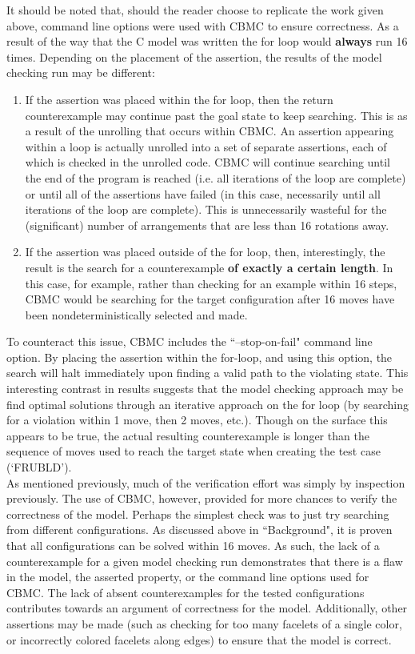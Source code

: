 \documentclass{article}
\begin{document}
\noindent It should be noted that, should the reader choose to replicate the work given above, command line options were used with CBMC to ensure correctness. As a result of the way that the C model was written the for loop would \textbf{always} run 16 times. Depending on the placement of the assertion, the results of the model checking run may be different:

\begin{enumerate}
\item If the assertion was placed within the for loop, then the return counterexample may continue past the goal state to keep searching. This is as a result of the unrolling that occurs within CBMC. An assertion appearing within a loop is actually unrolled into a set of separate assertions, each of which is checked in the unrolled code. CBMC will continue searching until the end of the program is reached (i.e. all iterations of the loop are complete) or until all of the assertions have failed (in this case, necessarily until all iterations of the loop are complete). This is unnecessarily wasteful for the (significant) number of arrangements that are less than 16 rotations away.
\item If the assertion was placed outside of the for loop, then, interestingly, the result is the search for a counterexample \textbf{of exactly a certain length}. In this case, for example, rather than checking for an example within 16 steps, CBMC would be searching for the target configuration after 16 moves have been nondeterministically selected and made.
\end{enumerate}

\noindent To counteract this issue, CBMC includes the ``--stop-on-fail" command line option. By placing the assertion within the for-loop, and using this option, the search will halt immediately upon finding a valid path to the violating state. This interesting contrast in results suggests that the model checking approach may be find optimal solutions through an iterative approach on the for loop (by searching for a violation within 1 move, then 2 moves, etc.). Though on the surface this appears to be true, the actual resulting counterexample is longer than the sequence of moves used to reach the target state when creating the test case (`FRUBLD').\\

\noindent As mentioned previously, much of the verification effort was simply by inspection previously. The use of CBMC, however, provided for more chances to verify the correctness of the model. Perhaps the simplest check was to just try searching from different configurations. As discussed above in ``Background", it is proven that all configurations can be solved within 16 moves. As such, the lack of a counterexample for a given model checking run demonstrates that there is a flaw in the model, the asserted property, or the command line options used for CBMC. The lack of absent counterexamples for the tested configurations contributes towards an argument of correctness for the model. Additionally, other assertions may be made (such as checking for too many facelets of a single color, or incorrectly colored facelets along edges) to ensure that the model is correct.
\end{document}
